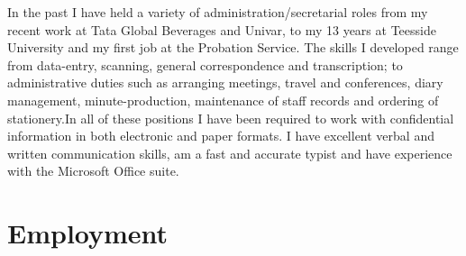 \documentclass[]{friggeri-cv}
\begin{document}
In the past I have held a variety of administration/secretarial roles from my recent work at Tata Global Beverages and Univar, to my 13 years at Teesside University and my first job at the Probation Service. The skills I developed range from data-entry, scanning, general correspondence and transcription; to administrative duties such as arranging meetings, travel and conferences, diary management, minute-production, maintenance of staff records and ordering of stationery.In all of these positions I have been required to work with confidential information in both electronic and paper formats. I have excellent verbal and written communication skills, am a fast and accurate typist and have experience with the Microsoft Office suite.

\section{Employment}
\end{document}
